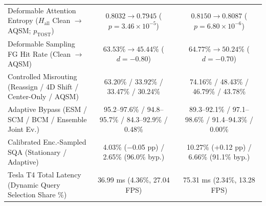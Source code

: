 \documentclass[preprint,10pt]{elsarticle}
\begin{document}
{\begin{table}[!htbp]
{\begin{tabular}{lcc}
Deformable Attention Entropy ($H_{\mathrm{all}}$ Clean $\to$ AQSM; $p_{\mathrm{TOST}}$) & $0.8032 \to 0.7945$ ($p = 3.46 \times 10^{-5}$) & $0.8150 \to 0.8087$ ($p = 6.80 \times 10^{-6}$) \\
Deformable Sampling FG Hit Rate (Clean $\to$ AQSM) & $63.53\% \to 45.44\%$ ($d=-0.80$) & $64.77\% \to 50.24\%$ ($d=-0.70$) \\
Controlled Misrouting (Reassign / 4D Shift / Center-Only / AQSM) & 63.20\% / 33.92\% / 33.47\% / 30.24\% & 74.16\% / 48.43\% / 46.79\% / 43.78\% \\
\midrule
Adaptive Bypass (ESM / SCM / BCM / Ensemble Joint Ev.) & 95.2--97.6\% / 94.8--95.7\% / 84.3--92.9\% / 0.48\% & 89.3--92.1\% / 97.1--98.6\% / 91.4--94.3\% / 0.00\% \\
Calibrated Enc.-Sampled SQA (Stationary / Adaptive) & 4.03\% ($-$0.05 pp) / 2.65\% (96.0\% byp.) & 10.27\% (+0.12 pp) / 6.66\% (91.1\% byp.) \\
Tesla T4 Total Latency (Dynamic Query Selection Share \%) & 36.99 ms (4.36\%, 27.04 FPS) & 75.31 ms (2.34\%, 13.28 FPS) \\
\bottomrule
\end{tabular}%
}
\end{table}
}
\end{document}
